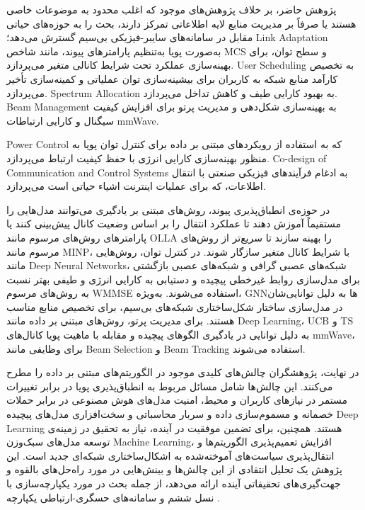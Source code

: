 پژوهش حاضر، بر خلاف پژوهش‌های موجود که اغلب محدود به موضوعات خاصی هستند یا صرفاً بر مدیریت منابع لایه اطلاعاتی تمرکز دارند، بحث را به حوزه‌های حیاتی مقابل در سامانه‌های سایبر-فیزیکی بی‌سیم گسترش می‌دهد؛
\gls{Link Adaptation}
به‌صورت پویا به‌تنظیم پارامترهای پیوند، مانند شاخص MCS و سطح توان، برای بهینه‌سازی عملکرد تحت شرایط کانالی متغیر می‌پردازد.
\gls{User Scheduling}
به تخصیص کارآمد منابع شبکه به کاربران برای بیشینه‌سازی توان عملیاتی و کمینه‌سازی تأخیر می‌پردازد.
\gls{Spectrum Allocation}
به بهبود کارایی طیف و کاهش تداخل می‌پردازد.
\gls{Beam Management}
به بهینه‌سازی شکل‌دهی و مدیریت پرتو برای افزایش کیفیت سیگنال و کارایی ارتباطات 
\gls{mmWave}.

\gls{Power Control}
که به استفاده از رویکردهای مبتنی بر داده برای کنترل توان پویا به منظور بهینه‌سازی کارایی انرژی با حفظ کیفیت ارتباط می‌پردازد.
\gls{Co-design of Communication and Control Systems}
به ادغام فرآیندهای فیزیکی صنعتی با انتقال اطلاعات، که برای عملیات اینترنت اشیاء  حیاتی است می‌پردازد.

در حوزه‌ی انطباق‌پذیری پیوند، روش‌های مبتنی بر یادگیری می‌توانند مدل‌هایی را مستقیماً آموزش دهند تا عملکرد انتقال را بر اساس وضعیت کانال پیش‌بینی کنند یا پارامترهای روش‌های مرسوم مانند 
\gls{OLLA}
را بهینه سازند تا سریع‌تر از روش‌های مرسوم مانند 
\gls{MINP}،
با شرایط کانال متغیر سازگار شوند. در کنترل توان، روش‌هایی مانند 
\glspl{Deep Neural Network}،
شبکه‌های عصبی گرافی و شبکه‌های عصبی بازگشتی برای مدل‌سازی روابط غیرخطی پیچیده و دستیابی به کارایی انرژی و طیفی بهتر نسبت به روش‌های مرسوم 
\gls{WMMSE}
استفاده می‌شوند. به‌ویژه، 
\gls{GNN}ها
به دلیل توانایی‌شان در مدل‌سازی ساختار شکل‌ساختاری شبکه‌های بی‌سیم، برای تخصیص منابع مناسب هستند. برای مدیریت پرتو، روش‌های مبتنی بر داده مانند 
\gls{Deep Learning}،
\gls{UCB}
و
\gls{TS}
به دلیل توانایی در یادگیری الگوهای پیچیده و مقابله با ماهیت پویا کانال‌های 
\gls{mmWave}،
برای وظایفی مانند 
\gls{Beam Selection}
و
\gls{Beam Tracking}
استفاده می‌شوند.

در نهایت، پژوهشگران چالش‌های کلیدی موجود در الگوریتم‌های مبتنی بر داده را مطرح می‌کنند. این چالش‌ها شامل مسائل مربوط به انطباق‌پذیری پویا در برابر تغییرات مستمر در نیازهای کاربران و محیط، امنیت مدل‌های هوش مصنوعی در برابر حملات خصمانه و مسموم‌سازی داده و سربار محاسباتی و سخت‌افزاری مدل‌های پیچیده 
\gls{Deep Learning}
هستند. همچنین، برای تضمین موفقیت در آینده، نیاز به تحقیق در زمینه‌ی توسعه مدل‌های سبک‌وزن 
\gls{Machine Learning}،
افزایش تعمیم‌پذیری الگوریتم‌ها و انتقال‌پذیری سیاست‌های آموخته‌شده به اشکال‌ساختاری‌ شبکه‌ای جدید است.
این پژوهش یک تحلیل انتقادی از این چالش‌ها و بینش‌هایی در مورد راه‌حل‌های بالقوه و جهت‌گیری‌های تحقیقاتی آینده ارائه می‌دهد، از جمله بحث در مورد یکپارچه‌سازی با نسل ششم و سامانه‌های حسگری-ارتباطی یکپارچه
\cite{RecentAdvances}.
